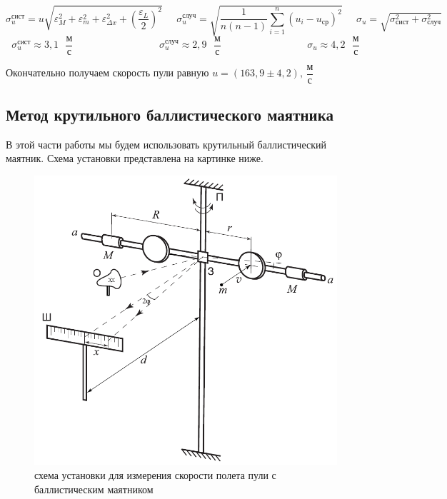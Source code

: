 \documentclass[a4paper,12pt]{article}
\begin{document}
	\begin{equation}
		\sigma_u^{\text{сист}} =u \sqrt{\varepsilon_M^2 + \varepsilon_m^2 + \varepsilon_{\Delta x}^2 + \left(\frac{\varepsilon_L}{2} \right)^2}  \;\;\;\;\; \sigma_u^{\text{случ}} = \sqrt{ \frac{1}{n(n-1)} \sum_{i=1}^{n}(u_i - u_{\text{ср}})^2} \;\;\;\;\; \sigma_u =\sqrt{\sigma_{\text{сист}}^2 + \sigma_\text{случ}^2} 
	\end{equation}
	\begin{equation}
		\sigma_u^\text{сист}\approx 3,1 \text{ }\dfrac{\text{м}}{\text{с}} \;\;\;\;\;\;\;\;\;\;\;\;\;\;\;\;\;\;\;\;\;\;\;\;\;\;\;\;\;\;\; \sigma_u^\text{случ}\approx 2,9 \text{ }\dfrac{\text{м}}{\text{с}} \;\;\;\;\;\;\;\;\;\;\;\;\;\;\;\;\;\;\;\;\;\;\;\;\;\;\;\;\;\;\;
		\sigma_u \approx 4,2 \text{ }\dfrac{\text{м}}{\text{с}}
	\end{equation}
	
	Окончательно получаем скорость пули равную \underline{$u = (163,9 \pm 4,2)\text{, }\dfrac{\text{м}}{\text{с}}$}
	
	\subsection{Метод крутильного баллистического маятника}
	
	В этой части работы мы будем использовать крутильный баллистический маятник. Схема установки представлена на картинке ниже.
	
	\begin{figure}[h]
		\begin{center}
			\includegraphics[scale = 0.66]{1.2.1 ustan2}
			\caption{схема установки для измерения скорости полета пули с баллистическим маятником}
		\end{center}
	\end{figure}
	
\end{document}
